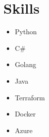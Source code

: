 \section{Skills}
\begin{itemize}
    \item Python
    \item C\#
    \item Golang
    \item Java
    \item Terraform
    \item Docker
    \item Azure
\end{itemize}
